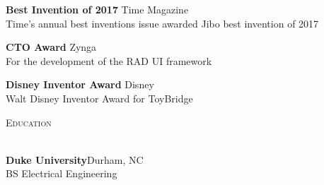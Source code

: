 \documentclass[a4paper]{article}
\newcommand{\lineunder} {
    \vspace*{-8pt} \\
    \hspace*{-18pt} \hrulefill \\
}
\newcommand{\header} [1] {
    {\hspace*{-18pt}\vspace*{6pt} \textsc{#1}}
    \vspace*{-6pt} \lineunder
    \vspace{2mm}
}
\begin{document}
\textbf{Best Invention of 2017} \hfill Time Magazine\\
Time's annual best inventions issue awarded Jibo best invention of 2017
\vspace*{2mm}

\textbf{CTO Award} \hfill Zynga\\
For the development of the RAD UI framework 
\vspace*{2mm}

\textbf{Disney Inventor Award} \hfill Disney\\
Walt Disney Inventor Award for ToyBridge
\vspace*{4mm}

\header{Education}
\textbf{Duke University}\hfill Durham, NC\\
BS Electrical Engineering\\
\vspace{4mm}
\end{document}
